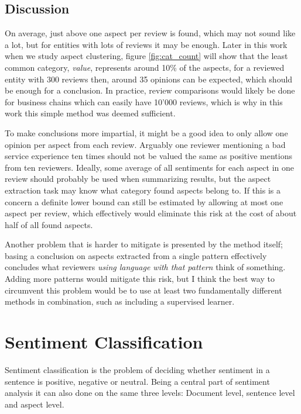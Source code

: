 \documentclass[a4paper,11pt]{kth-mag}
\begin{document}
\section{Discussion}

On average, just above one aspect per review is found, which may not sound like a lot, but for entities with lots of reviews it may be enough. Later in this work when we study aspect clustering, figure \ref{fig:cat_count} will show that the least common category, \emph{value}, represents around 10\% of the aspects, for a reviewed entity with 300 reviews then, around 35 opinions can be expected, which should be enough for a conclusion. In practice, review comparisons would likely be done for business chains which can easily have 10'000 reviews, which is why in this work this simple method was deemed sufficient.

To make conclusions more impartial, it might be a good idea to only allow one opinion per aspect from each review. Arguably one reviewer mentioning a bad service experience ten times should not be valued the same as positive mentions from ten reviewers. Ideally, some average of all sentiments for  each aspect in one review should probably be used when summarizing results, but the aspect extraction task may know what category found aspects belong to. If this is a concern a definite lower bound can still be estimated by allowing at most one aspect per review, which effectively would eliminate this risk at the cost of about half of all found aspects.

Another problem that is harder to mitigate is presented by the method itself; basing a conclusion on aspects extracted from a single pattern effectively concludes what reviewers \emph{using language with that pattern} think of something. Adding more patterns would mitigate this risk, but I think the best way to circumvent this problem would be to use at least two fundamentally different methods in combination, such as including a supervised learner.




\chapter{Sentiment Classification}
Sentiment classification is the problem of deciding whether sentiment in a sentence is positive, negative or neutral\cite{nlp_book}. Being a central part of sentiment analysis it can also done on the same three levels: Document level, sentence level and aspect level.
\end{document}
